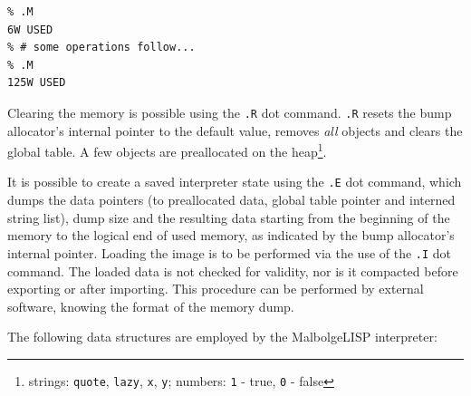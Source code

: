 \begin{verbatim}
% .M
6W USED
% # some operations follow...
% .M
125W USED
\end{verbatim}

\par Clearing the memory is possible using the \verb|.R| dot command. \verb|.R| resets the bump allocator's internal pointer to the default value, removes \textit{all} objects and clears the global table. A few objects are preallocated on the heap\footnote{strings: \verb|quote|, \verb|lazy|, \verb|x|, \verb|y|; numbers: \verb|1| - true, \verb|0| - false}.

\par It is possible to create a saved interpreter state using the \verb|.E| dot command, which dumps the data pointers (to preallocated data, global table pointer and interned string list), dump size and the resulting data starting from the beginning of the memory to the logical end of used memory, as indicated by the bump allocator's internal pointer. Loading the image is to be performed via the use of the \verb|.I| dot command. The loaded data is not checked for validity, nor is it compacted before exporting or after importing. This procedure can be performed by external software, knowing the format of the memory dump.

\par The following data structures are employed by the MalbolgeLISP interpreter:

